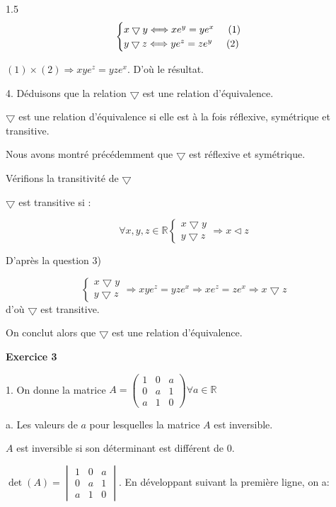 \documentclass[12pt]{article}
\begin{document}
\begin{spacing}{1.5}
\[
\begin{cases}
x\bigtriangledown y\Longleftrightarrow xe^y=ye^x \hspace*{0.5cm} (1)\\
y\bigtriangledown z\Longleftrightarrow ye^z=ze^y\hspace*{0.5cm} (2)
\end{cases}
\]

$(1)\times (2)\Rightarrow xye^z=yze^x$. D'où le résultat.

4. Déduisons que la relation $\bigtriangledown$ est une relation d'équivalence.

$\bigtriangledown$ est une relation d'équivalence si elle est à la fois réflexive, symétrique et transitive.

Nous avons montré précédemment que $\bigtriangledown$ est réflexive et symétrique.

Vérifions la transitivité de $\bigtriangledown$

$\bigtriangledown$ est transitive si :

\[\forall x,y,z \in \mathbb{R}\begin{cases}
x\bigtriangledown y\\
y\bigtriangledown z
\end{cases}\Rightarrow x\triangleleft z\]

D'après la question 3)

\[
\begin{cases}
x\bigtriangledown y\\
y\bigtriangledown z
\end{cases}\Rightarrow x	ye^z = yze^x\Rightarrow xe^z = ze^x\Rightarrow x\bigtriangledown z\] d'où $\bigtriangledown$ est transitive.

On conclut alors que $\bigtriangledown$ est une relation d'équivalence.

\medskip\textbf{Exercice 3}

1. On donne la matrice $A=\begin{pmatrix}
1 & 0 & a \\ 
0 & a & 1 \\ 
a & 1 & 0
\end{pmatrix} \forall a\in \mathbb{R}$

a. Les valeurs de $a$ pour lesquelles la matrice $A$ est inversible.

$A$ est inversible si son déterminant est différent de 0.

$\det(A)=\begin{vmatrix}
1 & 0 & a \\ 
0 & a & 1 \\ 
a & 1 & 0
\end{vmatrix}$. En développant suivant la première ligne, on a:


\end{spacing}
\end{document}
